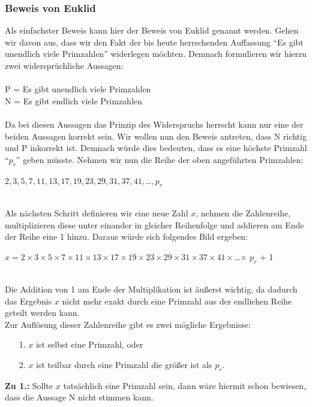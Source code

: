 \documentclass[german,12pt,a4paper]{article}
\begin{document}
\subsubsection{Beweis von Euklid}\label{Beweis von Euklid}
Als einfachster Beweis kann hier der Beweis von Euklid genannt werden.
Gehen wir davon aus, dass wir den Fakt der bis heute herrschenden Auffassung “Es gibt unendlich viele Primzahlen” widerlegen möchten.
Demnach formulieren wir hierzu zwei widersprüchliche Aussagen:\\\\
\hspace*{20mm}P = Es gibt unendlich viele Primzahlen\\
\hspace*{20mm}N = Es gibt endlich viele Primzahlen\\
\\Da bei diesen Aussagen das Prinzip des Widerspruchs herrscht kann nur eine der beiden Aussagen korrekt sein.
Wir wollen nun den Beweis antreten, dass N richtig und P inkorrekt ist.
Demnach würde dies bedeuten, dass es eine höchste Primzahl “$p_r$” geben müsste.
Nehmen wir nun die Reihe der oben angeführten Primzahlen:\\
\begin{center}
$2, 3, 5, 7, 11, 13, 17, 19, 23, 29, 31, 37, 41, $…$, p_r$
\end{center}\
\\Als nächsten Schritt definieren wir eine neue Zahl $x$, nehmen die Zahlenreihe, multiplizieren diese unter einander in gleicher Reihenfolge und addieren am Ende der Reihe eine 1 hinzu.
Daraus würde sich folgendes Bild ergeben:\\
\begin{center}
$x = 2\times3\times5\times7\times11\times13\times17\times19\times23\times29\times31\times37\times41\times$…$\times$ $p_r$ + 1
\end{center}\
\\Die Addition von 1 am Ende der Multiplikation ist äußerst wichtig, da dadurch das Ergebnis $x$ nicht mehr exakt durch eine Primzahl aus der endlichen Reihe geteilt werden kann.\\
Zur Auflösung dieser Zahlenreihe gibt es zwei mögliche Ergebnisse:
\begin{itemize}
\item[1.] $x$ ist selbst eine Primzahl, oder
\item[2.] $x$ ist teilbar durch eine Primzahl die größer ist als $p_r$.
\end{itemize}
\textbf{Zu 1.:} Sollte $x$ tatsächlich eine Primzahl sein, dann wäre hiermit schon bewiesen, dass die Aussage N nicht stimmen kann.
\end{document}
